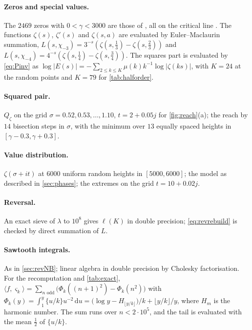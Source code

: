 \documentclass[11pt]{article}
\theoremstyle{definition}\newtheorem{definition}[theorem]{Definition}
\theoremstyle{remark}\newtheorem{remark}[theorem]{Remark}
\theoremstyle{definition}\newtheorem{axiom}{Axiom}
\newcommand{\dd}{\,\mathrm d}\newcommand{\e}{\mathrm e}
\newcommand{\fr}[1]{\{#1\}}
\begin{document}
\paragraph{Zeros and special values.} The $2469$ zeros with $0<\gamma<3000$ are those of \cite{S10}, all on the critical line \cite{PT}. The functions $\zeta(s)$, $\zeta'(s)$ and $\zeta(s,a)$ are evaluated by Euler--Maclaurin summation, $L(s,\chi_{-3})=3^{-s}(\zeta(s,\frac13)-\zeta(s,\frac23))$ and $L(s,\chi_{-4})=4^{-s}(\zeta(s,\frac14)-\zeta(s,\frac34))$. The squares part is evaluated by \eqref{eq:Pinv} as $\log|E(s)|=-\sum_{2\le k\le K}\mu(k)k^{-1}\log|\zeta(ks)|$, with $K=24$ at the random points and $K=79$ for \cref{tab:halforder}.

\paragraph{Squared pair.} $Q_\zeta$ on the grid $\sigma=0.52,0.53,\dots,1.10$, $t=2+0.05j$ for \cref{fig:reach}(a); the reach by $14$ bisection steps in $\sigma$, with the minimum over $13$ equally spaced heights in $[\gamma-0.3,\gamma+0.3]$.

\paragraph{Value distribution.} $\zeta(\sigma+it)$ at $6000$ uniform random heights in $[5000,6000]$; the model as described in \cref{sec:phases}; the extremes on the grid $t=10+0.02j$.

\paragraph{Reversal.} An exact sieve of $\lambda$ to $10^8$ gives $\ell(K)$ in double precision; \eqref{eq:revrebuild} is checked by direct summation of $L$.

\paragraph{Sawtooth integrals.} As in \cref{sec:revNB}; linear algebra in double precision by Cholesky factorisation. For the recomputation and \cref{tab:exact}, $\langle f,\varsigma_k\rangle=\sum_{n\text{ odd}}\bigl(\Phi_k((n+1)^2)-\Phi_k(n^2)\bigr)$ with $\Phi_k(y)=\int_1^y\fr{u/k}u^{-2}\dd u=\bigl(\log y-H_{\lfloor y/k\rfloor}\bigr)/k+\lfloor y/k\rfloor/y$, where $H_m$ is the harmonic number. The sum runs over $n<2\cdot10^5$, and the tail is evaluated with the mean $\frac12$ of $\fr{u/k}$.
\end{document}
